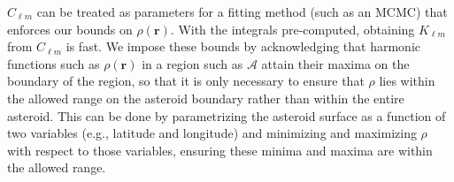 \documentclass[fleqn,usenatbib]{mnras}
\begin{document}
$C_{\ell m}$ can be treated as parameters for a fitting method (such as an MCMC) that enforces our bounds on $\rho(\bm r)$. With the integrals pre-computed, obtaining $K_{\ell m}$ from $C_{\ell m}$ is fast. We impose these bounds by acknowledging that harmonic functions such as $\rho(\bm r)$ in a region such as $\mathcal{A}$ attain their maxima on the boundary of the region, so that it is only necessary to ensure that $\rho$ lies within the allowed range on the asteroid boundary rather than within the entire asteroid. This can be done by parametrizing the asteroid surface as a function of two variables (e.g., latitude and longitude) and minimizing and maximizing $\rho$ with respect to those variables, ensuring these minima and maxima are within the allowed range.



\bsp
\label{lastpage}
\end{document}
